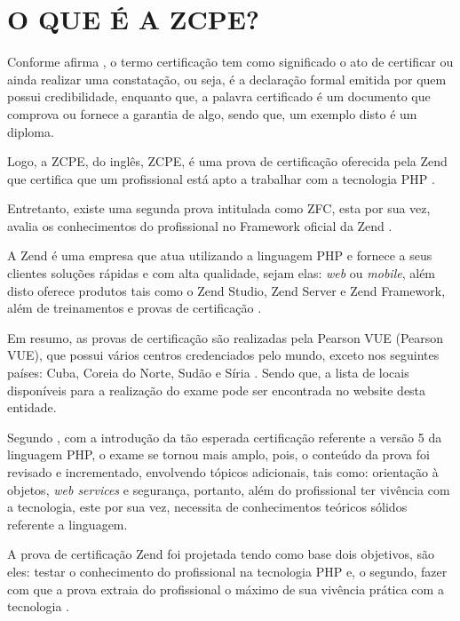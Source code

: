 \chapter{O QUE É A ZCPE?}
\label{zcpe}

Conforme afirma , o termo certificação tem como
significado o ato de certificar ou ainda realizar uma constatação, ou seja, é a
declaração formal emitida por quem possui credibilidade, enquanto que, a palavra
certificado é um documento que comprova ou fornece a garantia de algo, sendo
que, um exemplo disto é um diploma.

Logo, a \acs{ZCPE}, do inglês, \acl{ZCPE}, é uma prova de certificação oferecida
pela \acs{Zend} que certifica que um profissional está apto a trabalhar com a
tecnologia \acs{PHP} \cite{websiteZendZCPE}.

Entretanto, existe uma segunda prova intitulada como \ac{ZFC},
esta por sua vez, avalia os conhecimentos do profissional no
Framework oficial da \acs{Zend} \cite{websiteZendZFC}.

A \acs{Zend} é uma empresa que atua utilizando a linguagem \acs{PHP} e fornece
a seus clientes soluções rápidas e com alta qualidade, sejam elas:  \textit{web}
ou \textit{mobile}, além disto oferece produtos tais como o \acs{Zend Studio},
\acs{Zend Server} e \acs{Zend Framework}, além de treinamentos e provas de
certificação \cite{websiteZendCompany}.

Em resumo, as provas de certificação são realizadas pela \acs{Pearson VUE}
(\acl{Pearson VUE}), que possui vários centros credenciados pelo mundo,  exceto
nos seguintes países: Cuba, Coreia do Norte, Sudão e Síria
\cite{websiteZendZFC}. Sendo que, a lista de locais disponíveis para a
realização do exame pode ser encontrada no website desta entidade.

Segundo , com a introdução da tão
esperada certificação referente a versão 5 da linguagem \acs{PHP}, o exame se
tornou mais amplo, pois, o conteúdo da prova foi revisado e incrementado,
envolvendo  tópicos adicionais, tais como: orientação à objetos, \textit{web
services} e segurança, portanto, além do profissional ter vivência com a
tecnologia, este por sua vez, necessita de conhecimentos teóricos sólidos
referente a linguagem.

A prova de certificação \acs{Zend} foi projetada tendo como base dois objetivos, são
eles: testar o conhecimento do profissional na tecnologia \acs{PHP} e, o
segundo, fazer com que a prova extraia do profissional o máximo de sua vivência
prática com a tecnologia \cite{theZendPHPCertificationPracticeTestBook}.

